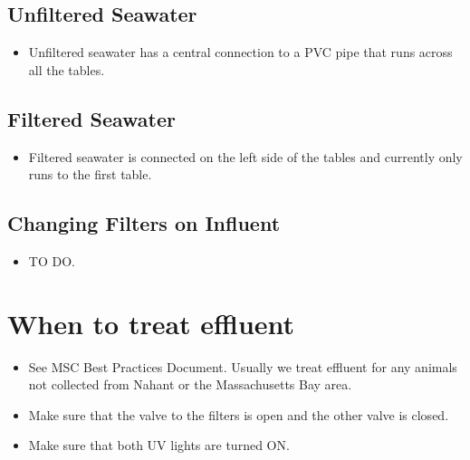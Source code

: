 \documentclass[
  letterpaper,
  DIV=11,
  numbers=noendperiod]{scrreprt}
\providecommand{\tightlist}{%
  \setlength{\itemsep}{0pt}\setlength{\parskip}{0pt}}\usepackage{longtable,booktabs,array}
\begin{document}
\hypertarget{unfiltered-seawater}{%
\subsection*{\texorpdfstring{\textbf{Unfiltered
Seawater}}{Unfiltered Seawater}}\label{unfiltered-seawater}}

\begin{itemize}
\tightlist
\item
  Unfiltered seawater has a central connection to a PVC pipe that runs
  across all the tables.
\end{itemize}

\hypertarget{filtered-seawater}{%
\subsection*{\texorpdfstring{\textbf{Filtered
Seawater}}{Filtered Seawater}}\label{filtered-seawater}}

\begin{itemize}
\tightlist
\item
  Filtered seawater is connected on the left side of the tables and
  currently only runs to the first table.
\end{itemize}

\hypertarget{changing-filters-on-influent}{%
\subsection*{\texorpdfstring{\textbf{Changing Filters on
Influent}}{Changing Filters on Influent}}\label{changing-filters-on-influent}}

\begin{itemize}
\tightlist
\item
  TO DO.
\end{itemize}

\hypertarget{when-to-treat-effluent}{%
\section*{\texorpdfstring{\textbf{When to treat
effluent}}{When to treat effluent}}\label{when-to-treat-effluent}}

\begin{itemize}
\item
  See MSC Best Practices Document. Usually we treat effluent for any
  animals not collected from Nahant or the Massachusetts Bay area.
\item
  Make sure that the valve to the filters is open and the other valve is
  closed.
\item
  Make sure that both UV lights are turned ON.
\end{itemize}
\end{document}
